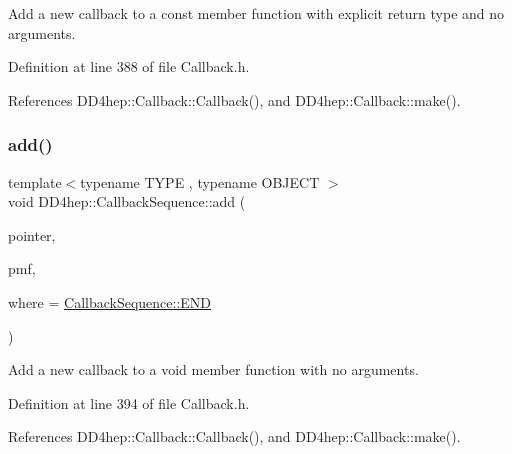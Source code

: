 Add a new callback to a const member function with explicit return type and no arguments. 



Definition at line 388 of file Callback.\+h.



References D\+D4hep\+::\+Callback\+::\+Callback(), and D\+D4hep\+::\+Callback\+::make().

\hypertarget{struct_d_d4hep_1_1_callback_sequence_aa6d53268b3bcd96d95773e8c12dbd6b6}{}\label{struct_d_d4hep_1_1_callback_sequence_aa6d53268b3bcd96d95773e8c12dbd6b6} 
\subsubsection{\texorpdfstring{add()}{add()}\hspace{0.1cm}{\footnotesize\ttfamily [4/13]}}
{\footnotesize\ttfamily template$<$typename T\+Y\+PE , typename O\+B\+J\+E\+CT $>$ \\
void D\+D4hep\+::\+Callback\+Sequence\+::add (\begin{DoxyParamCaption}\item[{T\+Y\+PE $\ast$}]{pointer,  }\item[{void(O\+B\+J\+E\+C\+T\+::$\ast$)()}]{pmf,  }\item[{\hyperlink{struct_d_d4hep_1_1_callback_sequence_a7753490247479633aed16a2376821ef7}{Location}}]{where = {\ttfamily \hyperlink{struct_d_d4hep_1_1_callback_sequence_a7753490247479633aed16a2376821ef7ac39eeb1bcfc1c235ab1d0d9315c310ac}{Callback\+Sequence\+::\+E\+ND}} }\end{DoxyParamCaption})\hspace{0.3cm}{\ttfamily [inline]}}



Add a new callback to a void member function with no arguments. 



Definition at line 394 of file Callback.\+h.



References D\+D4hep\+::\+Callback\+::\+Callback(), and D\+D4hep\+::\+Callback\+::make().

\hypertarget{struct_d_d4hep_1_1_callback_sequence_aac9098e7f436bd431f86f812cf2c65cd}{}\label{struct_d_d4hep_1_1_callback_sequence_aac9098e7f436bd431f86f812cf2c65cd} 
